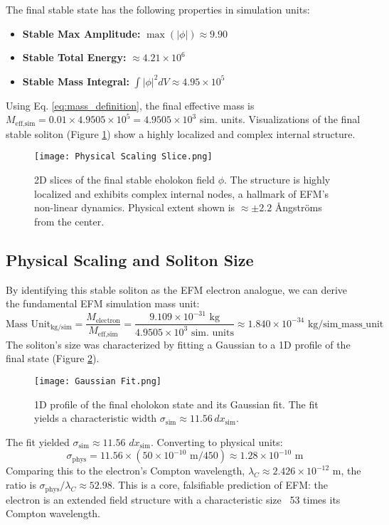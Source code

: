 \documentclass[11pt]{article}
\begin{document}
The final stable state has the following properties in simulation units:
\begin{itemize}
    \item \textbf{Stable Max Amplitude:} \(\max(|\phi|) \approx 9.90\)
    \item \textbf{Stable Total Energy:} \(\approx 4.21 \times 10^6\)
    \item \textbf{Stable Mass Integral:} \(\int|\phi|^2dV \approx 4.95 \times 10^5\)
\end{itemize}
Using Eq. \ref{eq:mass_definition}, the final effective mass is \(M_{\text{eff,sim}} = 0.01 \times 4.9505 \times 10^5 = 4.9505 \times 10^3\) sim. units. Visualizations of the final stable soliton (Figure \ref{fig:soliton_slices_zoomed}) show a highly localized and complex internal structure.

\begin{figure}[htbp]
    \centering
    \texttt{[image: Physical Scaling Slice.png]}
    \caption{2D slices of the final stable eholokon field \(\phi\). The structure is highly localized and exhibits complex internal nodes, a hallmark of EFM's non-linear dynamics. Physical extent shown is \(\approx \pm 2.2\) Ångströms from the center.}
    \label{fig:soliton_slices_zoomed}
\end{figure}

\subsection{Physical Scaling and Soliton Size}
By identifying this stable soliton as the EFM electron analogue, we can derive the fundamental EFM simulation mass unit:
\[
\text{Mass Unit}_{\text{kg/sim}} = \frac{M_{\text{electron}}}{M_{\text{eff,sim}}} = \frac{9.109 \times 10^{-31} \text{ kg}}{4.9505 \times 10^3 \text{ sim. units}} \approx 1.840 \times 10^{-34} \text{ kg/sim\_mass\_unit}
\]
The soliton's size was characterized by fitting a Gaussian to a 1D profile of the final state (Figure \ref{fig:ehokolon_profile_fit}).
\begin{figure}[htbp]
    \centering
    \texttt{[image: Gaussian Fit.png]}
    \caption{1D profile of the final eholokon state and its Gaussian fit. The fit yields a characteristic width \(\sigma_{\text{sim}} \approx 11.56 \, dx_{\text{sim}}\).}
    \label{fig:ehokolon_profile_fit}
\end{figure}
The fit yielded \(\sigma_{\text{sim}} \approx 11.56\) \(dx_{\text{sim}}\). Converting to physical units:
\[
\sigma_{\text{phys}} = 11.56 \times (50 \times 10^{-10} \text{ m} / 450) \approx 1.28 \times 10^{-10} \text{ m}
\]
Comparing this to the electron's Compton wavelength, \(\lambda_C \approx 2.426 \times 10^{-12}\) m, the ratio is \(\sigma_{\text{phys}} / \lambda_C \approx 52.98\). This is a core, falsifiable prediction of EFM: the electron is an extended field structure with a characteristic size ~53 times its Compton wavelength.
\end{document}

